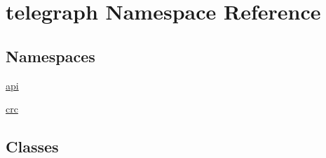 \hypertarget{namespacetelegraph}{}\section{telegraph Namespace Reference}
\label{namespacetelegraph}
\subsection*{Namespaces}
\begin{DoxyCompactItemize}
\item 
 \hyperlink{namespacetelegraph_1_1api}{api}
\item 
 \hyperlink{namespacetelegraph_1_1crc}{crc}
\end{DoxyCompactItemize}
\subsection*{Classes}
